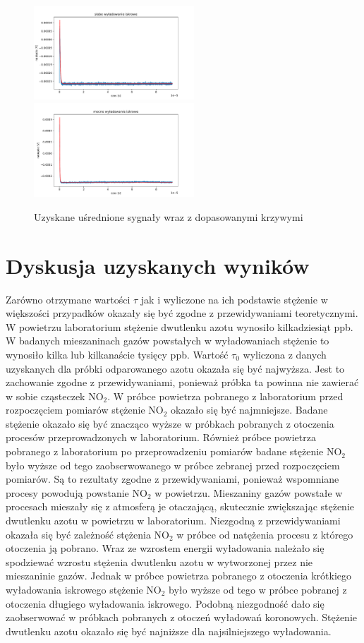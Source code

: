 \documentclass[10pt,a4paper]{article}
\begin{document}
\begin{figure}[h]
    \includegraphics[width=6cm]{spark1.pdf}
    \includegraphics[width=6cm]{spark2.pdf}
    \caption{Uzyskane uśrednione sygnały wraz z dopasowanymi krzywymi}
    \label{ch2_1}
\end{figure}

\newpage

\section{Dyskusja uzyskanych wyników}
Zarówno otrzymane wartości $\tau$ jak i wyliczone na ich podstawie stężenie w większości przypadków okazały się być zgodne z przewidywaniami teoretycznymi. W powietrzu laboratorium stężenie dwutlenku azotu wynosiło kilkadziesiąt ppb. W badanych mieszaninach gazów powstałych w wyładowaniach stężenie to wynosiło kilka lub kilkanaście tysięcy ppb.  Wartość $\tau_0$ wyliczona z danych uzyskanych dla próbki odparowanego azotu okazała się być najwyższa. Jest to zachowanie zgodne z przewidywaniami, ponieważ próbka ta powinna nie zawierać w sobie cząsteczek $\text{NO}_{\text{2}}$. W próbce powietrza pobranego z laboratorium przed rozpoczęciem pomiarów stężenie $\text{NO}_{\text{2}}$ okazało się być najmniejsze. Badane stężenie okazało się być znacząco wyższe w próbkach pobranych z otoczenia procesów przeprowadzonych w laboratorium. Również  próbce powietrza pobranego z laboratorium po przeprowadzeniu pomiarów badane stężenie $\text{NO}_{\text{2}}$ było wyższe od tego zaobserwowanego w próbce zebranej przed rozpoczęciem pomiarów. Są to rezultaty zgodne z przewidywaniami, ponieważ wspomniane procesy powodują powstanie $\text{NO}_{\text{2}}$ w powietrzu. Mieszaniny gazów powstałe w procesach mieszały się z atmosferą je otaczającą, skutecznie zwiększając stężenie dwutlenku azotu w powietrzu w laboratorium.
Niezgodną z przewidywaniami okazała się być zależność stężenia $\text{NO}_{\text{2}}$ w próbce od natężenia procesu z którego otoczenia ją pobrano. Wraz ze wzrostem energii wyładowania należało się spodziewać wzrostu stężenia dwutlenku azotu w wytworzonej przez nie mieszaninie gazów. Jednak w próbce powietrza pobranego z otoczenia krótkiego wyładowania iskrowego stężenie $\text{NO}_{\text{2}}$ było wyższe od tego w próbce pobranej z otoczenia długiego wyładowania iskrowego. Podobną niezgodność dało się zaobserwować w próbkach pobranych z otoczeń wyładowań koronowych. Stężenie dwutlenku azotu okazało się być najniższe dla najsilniejszego wyładowania.
\end{document}
